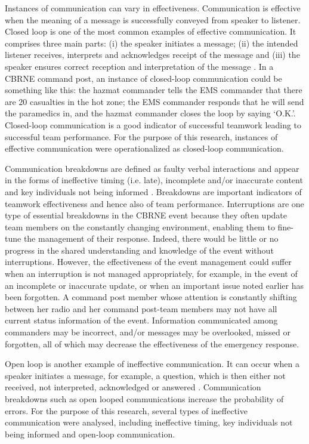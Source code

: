 \documentclass[link]{IWCOMP}
\begin{document}
Instances of communication can vary in effectiveness. Communication is
effective when the meaning of a message is successfully conveyed from
speaker to listener. Closed loop is one of the most common examples of
effective communication. It comprises three main parts: (i) the speaker
initiates a message; (ii) the intended listener receives, interprets and
acknowledges receipt of the message and (iii) the speaker ensures correct
reception and interpretation of the message \citep{bib34}. In a CBRNE
command post, an instance of closed-loop communication could be something
like this: the hazmat commander tells the EMS commander that there are 20
casualties in the hot zone; the EMS commander responds that he will send the
paramedics in, and the hazmat commander closes the loop by saying `O.K.'.
Closed-loop communication is a good indicator of successful teamwork leading
to successful team performance. For the purpose of this research, instances
of effective communication were operationalized as closed-loop
communication.

Communication breakdowns are defined as faulty verbal interactions and
appear in the forms of ineffective timing (i.e. late), incomplete and/or
inaccurate content and key individuals not being informed \citep{bib20}. Breakdowns are important indicators of teamwork effectiveness and
hence also of team performance. Interruptions are one type of essential
breakdowns in the CBRNE event because they often update team members on the
constantly changing environment, enabling them to fine-tune the management
of their response. Indeed, there would be little or no progress in the
shared understanding and knowledge of the event without interruptions.
However, the effectiveness of the event management could suffer when an
interruption is not managed appropriately, for example, in the event of an
incomplete or inaccurate update, or when an important issue noted earlier
has been forgotten. A command post member whose attention is constantly
shifting between her radio and her command post-team members may not have
all current status information of the event. Information communicated among
commanders may be incorrect, and/or messages may be overlooked, missed or
forgotten, all of which may decrease the effectiveness of the emergency
response.

Open loop is another example of ineffective communication. It can occur when
a speaker initiates a message, for example, a question, which is then either
not received, not interpreted, acknowledged or answered \citep{bib34}. Communication breakdowns such as open looped communications increase
the probability of errors. For the purpose of this research, several types
of ineffective communication were analysed, including ineffective timing,
key individuals not being informed and open-loop communication.
\end{document}
